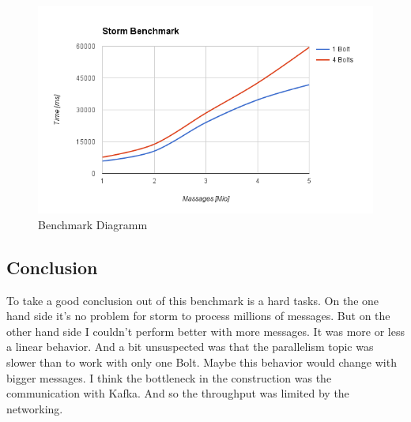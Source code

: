 \begin{figure}[H]
\centering
\captionsetup{justification=centering}
\includegraphics[width=1.0\textwidth]{images/benchmark.png}
\caption[Benchmark Diagramm]{Benchmark Diagramm}
\end{figure}

\subsection{Conclusion}
To take a good conclusion out of this benchmark is a hard tasks.
On the one hand side it's no problem for storm to process millions of messages.
But on the other hand side I couldn't perform better with more messages. It was more or less a linear behavior.
And a bit unsuspected was that the parallelism topic was slower than to work with only one Bolt.
Maybe this behavior would change with bigger messages.
I think the bottleneck in the construction was the communication with Kafka. And so the throughput was limited by the networking.





